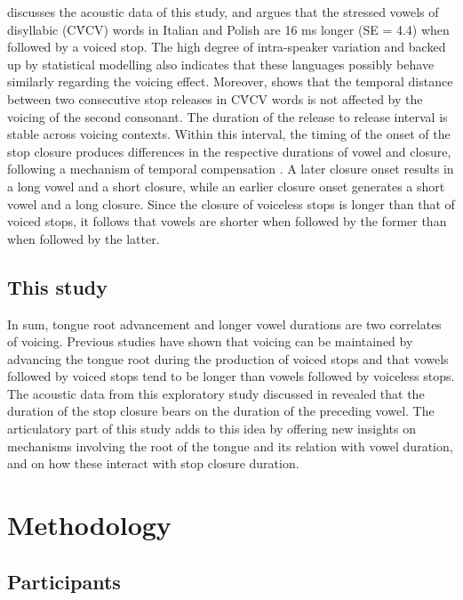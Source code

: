 \documentclass[12pt,]{article}
\begin{document}
\citet{coretta2018j} discusses the acoustic data of this study, and
argues that the stressed vowels of disyllabic (CV́CV) words in Italian
and Polish are 16 ms longer (SE = 4.4) when followed by a voiced stop.
The high degree of intra-speaker variation and backed up by statistical
modelling also indicates that these languages possibly behave similarly
regarding the voicing effect. Moreover, \citet{coretta2018j} shows that
the temporal distance between two consecutive stop releases in CV́CV
words is not affected by the voicing of the second consonant. The
duration of the release to release interval is stable across voicing
contexts. Within this interval, the timing of the onset of the stop
closure produces differences in the respective durations of vowel and
closure, following a mechanism of temporal compensation
\citep{lindblom1967, slis1969a, slis1969, lehiste1970, lehiste1970a}. A
later closure onset results in a long vowel and a short closure, while
an earlier closure onset generates a short vowel and a long closure.
Since the closure of voiceless stops is longer than that of voiced
stops, it follows that vowels are shorter when followed by the former
than when followed by the latter.

\hypertarget{this-study}{%
\subsection{This study}\label{this-study}}

In sum, tongue root advancement and longer vowel durations are two
correlates of voicing. Previous studies have shown that voicing can be
maintained by advancing the tongue root during the production of voiced
stops and that vowels followed by voiced stops tend to be longer than
vowels followed by voiceless stops. The acoustic data from this
exploratory study discussed in \citet{coretta2018j} revealed that the
duration of the stop closure bears on the duration of the preceding
vowel. The articulatory part of this study adds to this idea by offering
new insights on mechanisms involving the root of the tongue and its
relation with vowel duration, and on how these interact with stop
closure duration.

\hypertarget{methodology}{%
\section{Methodology}\label{methodology}}

\hypertarget{participants}{%
\subsection{Participants}\label{participants}}
\end{document}
